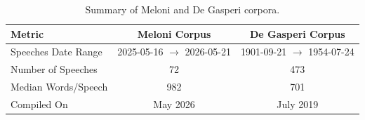 \begin{table}[h]
    \centering
    \caption{Summary of Meloni and De Gasperi corpora.}
    \label{tab:datasets_summary}
    \begin{tabular}{lcc}
        \toprule
        \textbf{Metric} & \textbf{Meloni Corpus} & \textbf{De Gasperi Corpus} \\
        \midrule
        Speeches Date Range           & 2025-05-16 $\rightarrow$ 2026-05-21 & 1901-09-21 $\rightarrow$ 1954-07-24 \\
        Number of Speeches             & 72                                  & 473                                 \\
        Median Words/Speech  & 982                                 & 701                                 \\
        Compiled On          & May 2026                            & July 2019                           \\
        \bottomrule
    \end{tabular}
\end{table}

